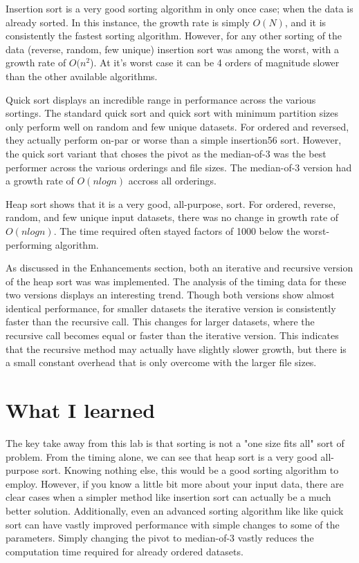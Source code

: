 \documentclass[a4paper,12pt]{article}
\begin{document}
Insertion sort is a very good sorting algorithm in only once case; when the data is already sorted.  In this instance, the growth rate is simply $O(N)$, and it is consistently the fastest sorting algorithm.  However, for any other sorting of the data (reverse, random, few unique) insertion sort was among the worst, with a growth rate of $O(n^2$).  At it's worst case it can be 4 orders of magnitude slower than the other available algorithms.

Quick sort displays an incredible range in performance across the various sortings.  The standard quick sort and quick sort with minimum partition sizes only perform well on random and few unique datasets.  For ordered and reversed, they actually perform on-par or worse than a simple insertion56 sort.  However, the quick sort variant that choses the pivot as the median-of-3 was the best performer across the various orderings and file sizes.  The median-of-3 version had a growth rate of $O(nlogn)$ accross all orderings.

Heap sort shows that it is a very good, all-purpose, sort.  For ordered, reverse, random, and few unique input datasets, there was no change in growth rate of $O(nlogn)$.  The time required often stayed factors of 1000 below the worst-performing algorithm. 

As discussed in the Enhancements section, both an iterative and recursive version of the heap sort was was implemented.  The analysis of the timing data for these two versions displays an interesting trend.  Though both versions show almost identical performance, for smaller datasets the iterative version is consistently faster than the recursive call.  This changes for larger datasets, where the recursive call becomes equal or faster than the iterative version.  This indicates that the recursive method may actually have slightly slower growth, but there is a small constant overhead that is only overcome with the larger file sizes.



\section{What I learned}
The key take away from this lab is that sorting is not a "one size fits all" sort of problem.  From the timing alone, we can see that heap sort is a very good all-purpose sort.  Knowing nothing else, this would be a good sorting algorithm to employ.  However, if you know a little bit more about your input data, there are clear cases when a simpler method like insertion sort can actually be a much better solution.  Additionally, even an advanced sorting algorithm like like quick sort can have vastly improved performance with simple changes to some of the parameters.  Simply changing the pivot to median-of-3 vastly reduces the computation time required for already ordered datasets.
\end{document}
